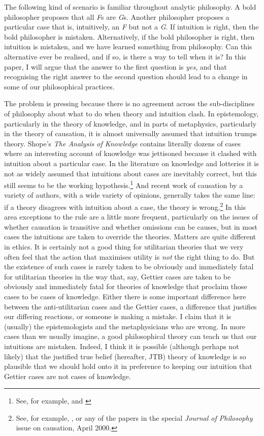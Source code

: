 The following kind of scenario is familiar throughout analytic philosophy. A bold philosopher proposes that all \textit{F}s are \textit{G}s. Another philosopher proposes a particular case that is, intuitively, an \textit{F} but not a \textit{G}. If intuition is right, then the bold philosopher is mistaken. Alternatively, if the bold philosopher is right, then intuition is mistaken, and we have learned something from philosophy. Can this alternative ever be realised, and if so, is there a way to tell when it is? In this paper, I will argue that the answer to the first question is \textit{yes}, and that recognising the right answer to the second question should lead to a change in some of our philosophical practices.

The problem is pressing because there is no agreement across the sub-disciplines of philosophy about what to do when theory and intuition clash. In epistemology, particularly in the theory of knowledge, and in parts of metaphysics, particularly in the theory of causation, it is almost universally assumed that intuition trumps theory. Shope's \textit{The Analysis of Knowledge} contains literally dozens of cases where an interesting account of knowledge was jettisoned because it clashed with intuition about a particular case. In the literature on knowledge and lotteries it is not as widely assumed that intuitions about cases are inevitably correct, but this still seems to be the working hypothesis.\footnote{See, for example, \citet{DeRose1996} and \citet{Nelkin2000}} And recent work of causation by a variety of authors, with a wide variety of opinions, generally takes the same line: if a theory disagrees with intuition about a case, the theory is wrong.\footnote{See, for example, \citet{Menzies1996}, or any of the papers in the special \textit{Journal of Philosophy} issue on causation, April 2000.} In this area exceptions to the rule are a little more frequent, particularly on the issues of whether causation is transitive and whether omissions can be causes, but in most cases the intuitions are taken to override the theories. Matters are quite different in ethics. It is certainly not a good thing for utilitarian theories that we very often feel that the action that maximises utility is \textit{not} the right thing to do. But the existence of such cases is rarely taken to be obviously and immediately fatal for utilitarian theories in the way that, say, Gettier cases are taken to be obviously and immediately fatal for theories of knowledge that proclaim those cases to be cases of knowledge. Either there is some important difference here between the anti-utilitarian cases and the Gettier cases, a difference that justifies our differing reactions, or someone is making a mistake. I claim that it is (usually) the epistemologists and the metaphysicians who are wrong. In more cases than we usually imagine, a good philosophical theory can teach us that our intuitions are mistaken. Indeed, I think it is possible (although perhaps not likely) that the justified true belief (hereafter, JTB) theory of knowledge is so plausible that we should hold onto it in preference to keeping our intuition that Gettier cases are not cases of knowledge.


